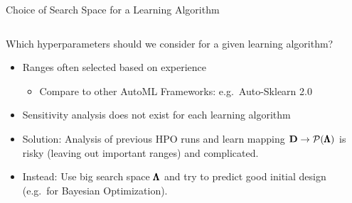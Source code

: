 \begin{frame}{Choice of Search Space for a Learning Algorithm}
  \begin{columns}
    \begin{column}{0.6\textwidth}
    Which hyperparameters should we consider for a given learning algorithm?
    \begin{itemize}
      \item Ranges often selected based on experience
      \begin{itemize}
        \item Compare to other AutoML Frameworks: e.g.\ Auto-Sklearn 2.0~ 
      \end{itemize}
      \item Sensitivity analysis does not exist for each learning algorithm
      \item Solution: Analysis of previous HPO runs and learn mapping $\mathbf{D} \rightarrow \mathcal{P}(\pmb{\Lambda})$ is risky (leaving out important ranges) and complicated.
      \item Instead: Use big search space $\pmb{\Lambda}$ and try to predict good initial design (e.g.\ for Bayesian Optimization).
    \end{itemize}
    \end{column}%
    \begin{column}{0.4\textwidth}
      \begin{center}
\end{center}
\end{column}
\end{columns}
\end{frame}
